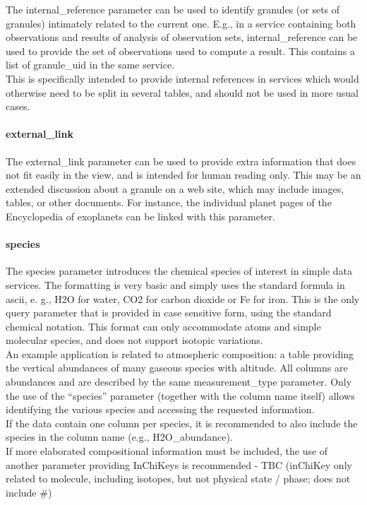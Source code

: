 \documentclass[11pt,a4paper]{ivoa}
\begin{document}
The internal\_reference parameter can be used to identify granules (or sets of granules) intimately related to the current one. E.g., in a service containing both observations and results of analysis of observation sets, internal\_reference can be used to provide the set of observations used to compute a result. This contains a list of granule\_uid in the same service.\\This is specifically intended to provide internal references in services which would otherwise need to be split in several tables, and should not be used in more usual cases. 

\paragraph{external\_link}

The external\_link parameter can be used to provide extra information that does not fit easily in the view, and is intended for human reading only. This may be an extended discussion about a granule on a web site, which may include images, tables, or other documents. For instance, the individual planet pages of the Encyclopedia of exoplanets can be linked with this parameter. \\

\paragraph{species}

The species parameter introduces the chemical species of interest in simple data services. The formatting is very basic and simply uses the standard formula in ascii, e. g., H2O for water, CO2 for carbon dioxide or Fe for iron. This is the only query parameter that is provided in case sensitive form, using the standard chemical notation. This format can only accommodate atoms and simple molecular species, and does not support isotopic variations. \\ An example application is related to atmospheric composition: a table providing the vertical abundances of many gaseous species with altitude. All columns are abundances and are described by the same measurement\_type parameter. Only the use of the ``species'' parameter (together with the column name itself) allows identifying the various species and accessing the requested information.\\ If the data contain one column per species, it is recommended to also include the species in the column name (e.g., H2O\_abundance). \\ If more elaborated compositional information must be included, the use of another parameter providing InChiKeys is recommended - TBC (inChiKey only related to molecule, including isotopes, but not physical state / phase; does not include \#)\\
\end{document}
